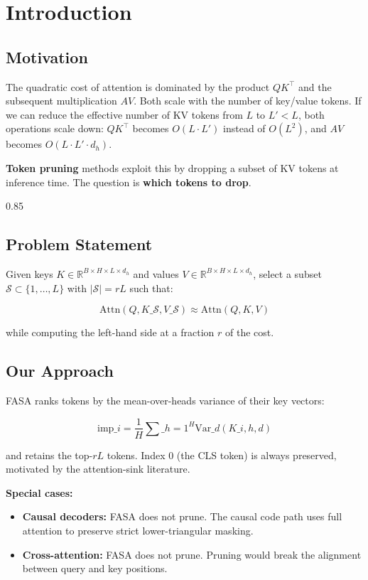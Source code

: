 
\section{Introduction}

\subsection{Motivation}

The quadratic cost of attention is dominated by the product $QK^\top$ and 
the subsequent multiplication $AV$. Both scale with the number of key/value 
tokens. If we can reduce the effective number of KV tokens from $L$ to 
$L' < L$, both operations scale down: $QK^\top$ becomes $O(L \cdot L')$ 
instead of $O(L^2)$, and $AV$ becomes $O(L \cdot L' \cdot d_h)$.

\textbf{Token pruning} methods exploit this by dropping a subset of KV tokens 
at inference time. The question is \textbf{which tokens to drop}.

0.85


\subsection{Problem Statement}

Given keys $K \in \mathbb{R}^{B \times H \times L \times d_h}$ and values 
$V \in \mathbb{R}^{B \times H \times L \times d_h}$, select a subset 
$\mathcal{S} \subset \{1, \ldots, L\}$ with $|\mathcal{S}| = r L$ such that:

\[
\text{Attn}(Q, K\_{\mathcal{S}}, V\_{\mathcal{S}}) \approx \text{Attn}(Q, K, V)
\tag{1.1}
\]

while computing the left-hand side at a fraction $r$ of the cost.

\subsection{Our Approach}

FASA ranks tokens by the mean-over-heads variance of their key vectors:

\[
\text{imp}\_i = \frac{1}{H} \sum\_{h=1}^{H} \text{Var}\_d(K\_{i,h,d})
\tag{1.2}
\]

and retains the top-$rL$ tokens. Index 0 (the CLS token) is always 
preserved, motivated by the attention-sink literature.

\textbf{Special cases:}
\begin{itemize}
\item \textbf{Causal decoders:} FASA does not prune. The causal code path uses full
  attention to preserve strict lower-triangular masking.
\item \textbf{Cross-attention:} FASA does not prune. Pruning would break the
  alignment between query and key positions.

\end{itemize}
